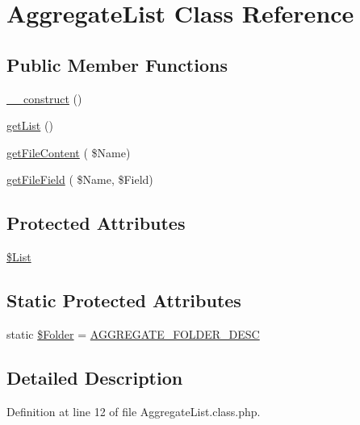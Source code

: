 \hypertarget{class_aggregate_list}{}\section{Aggregate\+List Class Reference}
\label{class_aggregate_list}
\subsection*{Public Member Functions}
\begin{DoxyCompactItemize}
\item 
\hyperlink{class_aggregate_list_aacb0c8f06040c9a462bbb39b0fe56dec}{\+\_\+\+\_\+construct} ()
\item 
\hyperlink{class_aggregate_list_ae6e31bb1eb6117cdaad4c5678e76b735}{get\+List} ()
\item 
\hyperlink{class_aggregate_list_a24c68fc9f46133f4e975621dd176e2e9}{get\+File\+Content} ( \$Name)
\item 
\hyperlink{class_aggregate_list_a74c1ba53120bbe24223f3812c53f8084}{get\+File\+Field} ( \$Name, \$Field)
\end{DoxyCompactItemize}
\subsection*{Protected Attributes}
\begin{DoxyCompactItemize}
\item 
\hyperlink{class_aggregate_list_abf86a0cf0d24900814fc5a8fe866e7cb}{\$\+List}
\end{DoxyCompactItemize}
\subsection*{Static Protected Attributes}
\begin{DoxyCompactItemize}
\item 
static \hyperlink{class_aggregate_list_ac39e769305e4c3b5529197d24f72878f}{\$\+Folder} = \hyperlink{application_2src_2define_8php_a31fbb35aca55ac5b16972f6d309e92e2}{A\+G\+G\+R\+E\+G\+A\+T\+E\+\_\+\+F\+O\+L\+D\+E\+R\+\_\+\+D\+E\+SC}
\end{DoxyCompactItemize}


\subsection{Detailed Description}


Definition at line 12 of file Aggregate\+List.\+class.\+php.



